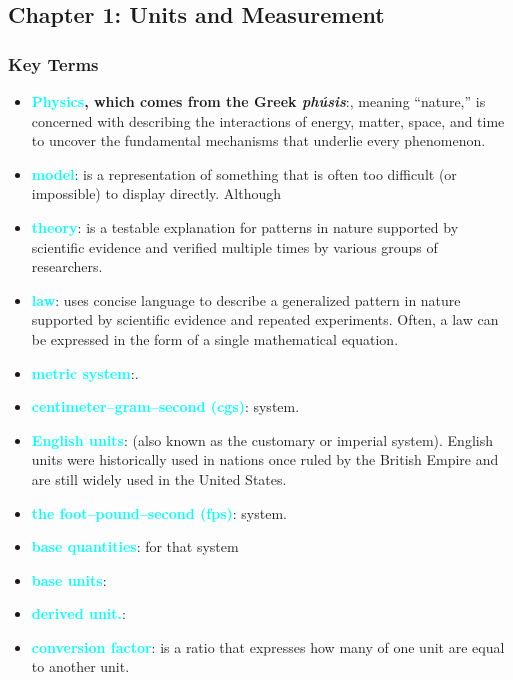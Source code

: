 \documentclass{report}
\begin{document}
    \pagebreak 
    \bigbreak \noindent 
    \subsection{Chapter 1: Units and Measurement}
    \smallbreak \noindent
    \subsubsection{Key Terms}
    \begin{itemize}
        \item \textbf{\textcolor{cyan}{Physics}, which comes from the Greek \textit{phúsis}}:, meaning “nature,” is concerned with describing the interactions of energy, matter, space, and time to uncover the fundamental mechanisms that underlie every phenomenon.
        \item \textbf{\textcolor{cyan}{model}}: is a representation of something that is often too difficult (or impossible) to display directly. Although
        \item \textbf{\textcolor{cyan}{theory}}: is a testable explanation for patterns in nature supported by scientific evidence and verified multiple times by various groups of researchers.
        \item \textbf{\textcolor{cyan}{law}}: uses concise language to describe a generalized pattern in nature supported by scientific evidence and repeated experiments. Often, a law can be expressed in the form of a single mathematical equation. 
        \item \textbf{\textcolor{cyan}{metric system}}:.
        \item \textbf{\textcolor{cyan}{centimeter–gram–second (cgs)}}: system.
        \item \textbf{\textcolor{cyan}{English units}}: (also known as the customary or imperial system). English units were historically used in nations once ruled by the British Empire and are still widely used in the United States.
        \item \textbf{\textcolor{cyan}{the foot–pound–second (fps)}}: system. 
        \item \textbf{\textcolor{cyan}{base quantities}}: for that system
        \item \textbf{\textcolor{cyan}{base units}}:
        \item \textbf{\textcolor{cyan}{derived unit.}}:
        \item \textbf{\textcolor{cyan}{conversion factor}}: is a ratio that expresses how many of one unit are equal to another unit.

\end{itemize}
\end{document}

